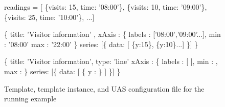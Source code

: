 \begin{figure*}
\begin{minipage}[c]{6cm}
\begin{minipage}[c]{6cm}
\begin{code}
readings = [
   \{visits: 15, time: '08:00'\}, 
   \{visits: 10, time: '09:00'\},
   \{visits: 25, time: '10:00'\},  ...]
\end{code}
\vspace*{-0.4cm}
\label{figure:running-example:query-result}
\vspace*{0.3cm}
\end{minipage}
%
\vspace*{0.6cm}
\end{minipage}
\hspace{2cm}
\begin{minipage}[c]{6cm}
\begin{minipage}[c]{7.5cm}
\begin{code}
   \{
    title: 'Visitor information' ,
    xAxis : \{ 
      labels : ['08:00','09:00'...],
      min : '08:00'
      max : '22:00'
    \}
    series: [\{ data: [ \{y:15\}, \{y:10\}...] \}]
  \} 
\end{code}
\vspace*{-0.4cm}
\vspace*{0.3cm}
\label{figure:running-example:unit-body}
\end{minipage}
\begin{minipage}[c]{7.5cm}
\begin{code}
   \{
    title: 'Visitor information',
    type: 'line'
    xAxis : \{ 
      labels : [
        ],
      min : ,
      max : 
    \}
    series: [\{
      data: [ 
          \{
            y  : 
          \}
         ]
    \}]
  \} 
\end{code}
\vspace*{-0.3cm}
\vspace*{0cm}
\label{figure:first-running-example:main-template}
\end{minipage}
\end{minipage}
\vspace*{-0.3cm}
\caption{Template, template instance, and UAS configuration file for the running example}
\vspace*{-0.3cm}
\end{figure*}


